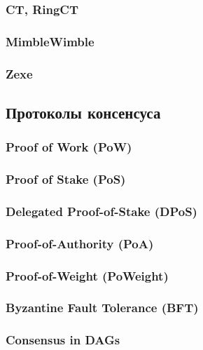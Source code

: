 \subsubsection{CT, RingCT}
\subsubsection{MimbleWimble}
\subsubsection{Zexe}


\subsection{Протоколы консенсуса}
\subsubsection{Proof of Work (PoW)}
\subsubsection{Proof of Stake (PoS)}
\subsubsection{Delegated Proof-of-Stake (DPoS)}
\subsubsection{Proof-of-Authority (PoA)}
\subsubsection{Proof-of-Weight (PoWeight)}
\subsubsection{Byzantine Fault Tolerance (BFT)}
\subsubsection{Consensus in DAGs}
